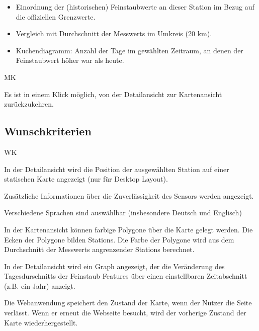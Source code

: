 \begin{itemize}
	\item Einordnung der (historischen) Feinstaubwerte an dieser \gls{Station} im Bezug auf die offiziellen Grenzwerte.
    \item Vergleich mit Durchschnitt der \glspl{Messwert} im Umkreis (20 km).
    \item \gls{Kuchendiagramm}: Anzahl der Tage im gewählten Zeitraum, an denen der Feinstaubwert höher war als heute.
\end{itemize}

\begin{Kriterien}{MK}	

	\item Es ist in einem Klick möglich, von der \gls{Detailansicht} zur \gls{Kartenansicht} zurückzukehren.

\end{Kriterien}

\newpage
\subsection{Wunschkriterien}
\setcounter{counter}{10}
\begin{Kriterien}{WK}

	\item In der \gls{Detailansicht} wird die Position der ausgewählten \gls{Station} auf einer statischen Karte angezeigt 
	(nur für Desktop Layout). 

	\item Zusätzliche Informationen über die Zuverlässigkeit des Sensors werden angezeigt.

	\item Verschiedene Sprachen sind auswählbar (insbesondere Deutsch und Englisch)
	
	\item In der \gls{Kartenansicht} können farbige Polygone über die Karte gelegt werden. Die Ecken der Polygone bilden 
	\glspl{Station}. Die Farbe der Polygone wird aus dem Durchschnitt der \glspl{Messwert} angrenzender \glspl{Station} berechnet.
	
	\item In der \gls{Detailansicht} wird ein \gls{Graph} angezeigt, der die Veränderung des Tagesdurschnitts der Feinstaub 
	\glspl{Feature} über einen einstellbaren Zeitabschnitt (z.B. ein Jahr) anzeigt.
	
	\item Die Webanwendung speichert den Zustand der Karte, wenn der Nutzer die Seite verlässt. Wenn er erneut die 
	 Webseite besucht, wird der vorherige Zustand der Karte wiederhergestellt.

\end{Kriterien}

